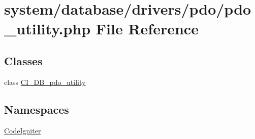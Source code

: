 \hypertarget{pdo__utility_8php}{}\section{system/database/drivers/pdo/pdo\+\_\+utility.php File Reference}
\label{pdo__utility_8php}
\subsection*{Classes}
\begin{DoxyCompactItemize}
\item 
class \mbox{\hyperlink{class_c_i___d_b__pdo__utility}{C\+I\+\_\+\+D\+B\+\_\+pdo\+\_\+utility}}
\end{DoxyCompactItemize}
\subsection*{Namespaces}
\begin{DoxyCompactItemize}
\item 
 \mbox{\hyperlink{namespace_code_igniter}{Code\+Igniter}}
\end{DoxyCompactItemize}
